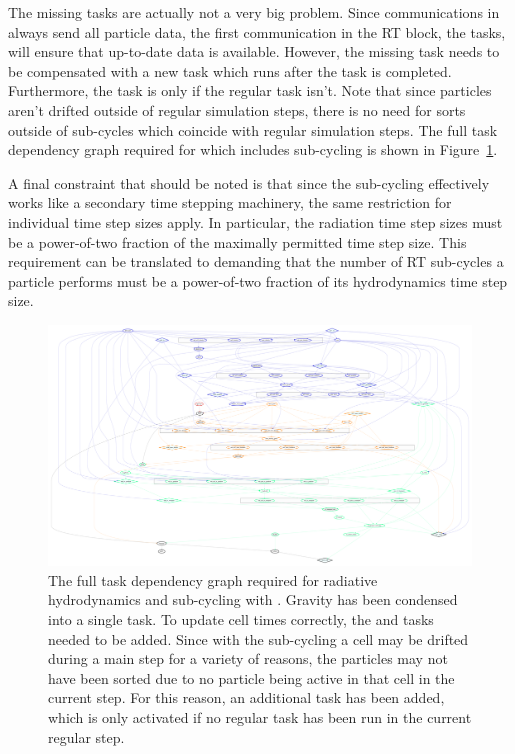 The missing  tasks are actually not a very big problem. Since communications in
\swift always send all particle data, the first communication in the RT block, the
 tasks, will ensure that up-to-date data is available. However, the
missing  task needs to be compensated with a new  task which runs
after the  task is completed. Furthermore, the  task  is
only  if the regular  task isn't. Note that since particles aren't
drifted outside of regular simulation steps, there is no need for sorts outside of sub-cycles which
coincide with regular simulation steps. The full task dependency graph required for \GEARRT which
includes sub-cycling is shown in Figure~\ref{fig:RTtaskplot}.


A final constraint that should be noted is that since the sub-cycling effectively works like a
secondary time stepping machinery, the same restriction for individual time step sizes apply. In
particular, the radiation time step sizes must be a power-of-two fraction of the maximally
permitted time step size. This requirement can be translated to demanding that the number of
RT sub-cycles a particle performs must be a power-of-two fraction of its hydrodynamics time step
size.








\begin{figure}
 \centering
 \includegraphics[angle=90,height=.9\textheight]{figures/RHD/dependency_graph_full.pdf}%
 \caption{
The full task dependency graph required for radiative hydrodynamics and sub-cycling with \swift.
Gravity has been condensed into a single task. To update cell times correctly, the
 and  tasks needed to be added. Since with the
sub-cycling a cell may be drifted during a main step for a variety of reasons, the particles may not
have been sorted due to no particle being active in that cell in the current step. For this reason,
an additional  task has been added, which is only activated if no regular
 task has been run in the current regular step.
 }
 \label{fig:RTtaskplot}
\end{figure}






